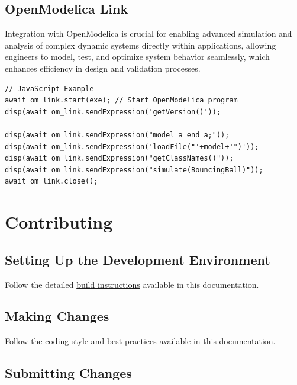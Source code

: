 \documentclass[12pt,a4paper]{article}
\begin{document}
\subsection{OpenModelica Link}
\label{sec:openmodelica-link}

Integration with OpenModelica is crucial for enabling advanced simulation and analysis of complex dynamic systems directly within applications, allowing engineers to model, test, and optimize system behavior seamlessly, which enhances efficiency in design and validation processes.

\begin{lstlisting}[style=JavaScriptStyle]
// JavaScript Example
await om_link.start(exe); // Start OpenModelica program
disp(await om_link.sendExpression('getVersion()'));

disp(await om_link.sendExpression("model a end a;"));
disp(await om_link.sendExpression('loadFile("'+model+'")'));
disp(await om_link.sendExpression("getClassNames()"));
disp(await om_link.sendExpression("simulate(BouncingBall)"));
await om_link.close();
\end{lstlisting}

\section{Contributing}

\subsection{Setting Up the Development Environment}

Follow the detailed \hyperref[build-instructions]{build instructions} available in this documentation.

\subsection{Making Changes}

Follow the \hyperref[coding-style]{coding style and best practices} available in this documentation.

\subsection{Submitting Changes}
\end{document}
